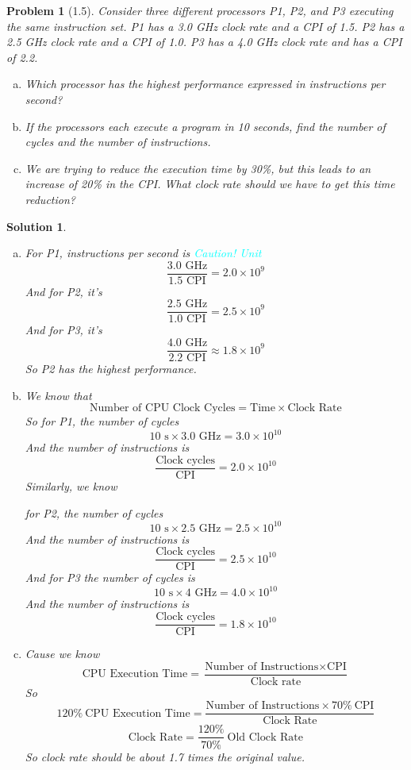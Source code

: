 \documentclass[12pt]{article}
\newtheorem{problem}{Problem}[]
\newtheorem*{solution}{Solution}
\begin{document}
    \begin{problem}[1.5]
      Consider three different processors P1, P2, and P3 executing the same instruction set. P1 has a 3.0 GHz clock rate and a CPI of 1.5. P2 has a 2.5 GHz clock rate and a CPI of 1.0. P3 has a 4.0 GHz clock rate and has a CPI of 2.2.
      \begin{enumerate}[a.]
        \item Which processor has the highest performance expressed in instructions per second?
        \item If the processors each execute a program in 10 seconds, find the number of cycles and the number of instructions.
        \item We are trying to reduce the execution time by 30\%, but this leads to an increase of 20\% in the CPI. What clock rate should we have to get this time reduction?
      \end{enumerate}
    \end{problem}

    \begin{solution}
      \begin{enumerate}[a.]
        \item For P1, instructions per second is     \textcolor{cyan}{Caution! Unit}
        \[\frac{3.0\text{ GHz}}{1.5\text{ CPI}} = 2.0\times 10^9\]
        And for P2, it's
        \[\frac{2.5\text{ GHz}}{1.0\text{ CPI}} = 2.5\times 10^9\]
        And for P3, it's
        \[\frac{4.0\text{ GHz}}{2.2\text{ CPI}} \approx 1.8\times 10^9\]
        So P2 has the highest performance.
        \item We know that
        \[\text{Number of CPU Clock Cycles} = \text{Time}\times \text{Clock Rate}\]
        So for P1, the number of cycles
        \[10\text{ s}\times 3.0\text{ GHz} = 3.0\times 10^{10}\]
        And the number of instructions is
        \[\frac{\text{Clock cycles}}{\text{CPI}}=2.0\times 10^{10}\]
        Similarly, we know \par 
        for P2, the number of cycles
        \[10\text{ s}\times 2.5\text{ GHz} = 2.5\times 10^{10}\]
        And the number of instructions is
        \[\frac{\text{Clock cycles}}{\text{CPI}}=2.5\times 10^{10}\]
        And for P3 the number of cycles is
        \[10\text{ s}\times 4\text{ GHz} = 4.0\times 10^{10}\]
        And the number of instructions is
        \[\frac{\text{Clock cycles}}{\text{CPI}}=1.8\times 10^{10}\]
        \item Cause we know
        \[\text{CPU Execution Time} = \frac{\text{Number of Instructions}\times \text{CPI}}{\text{Clock rate}}\]
        So 
        \[120\%\ \text{CPU Execution Time} = \frac{\text{Number of Instructions}\times70\%\ \text{CPI}}{\text{Clock Rate}}\]
        \[\text{Clock Rate} = \frac{120\%}{70\%}\ \text{Old Clock Rate}\]
        So clock rate should be about 1.7 times the original value.
      \end{enumerate}
    \end{solution}
\end{document}
